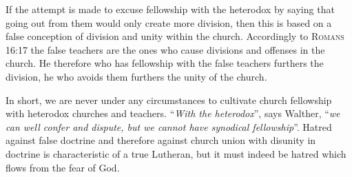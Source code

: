                 If the attempt is made to excuse fellowship with the heterodox by saying that going out from them would only create more division, then this is based on a false conception of division and unity within the church.  Accordingly to {\scriptsize\textsc{Romans 16:17}} the false teachers are the ones who cause divisions and offenses in the church.  He therefore who has fellowship with the false teachers furthers the division, he who avoids them furthers the unity of the church.\par
                In short, we are never under any circumstances to cultivate church fellowship with heterodox churches and teachers.  “\textit{With the heterodox}”, says Walther, ``\textit{we can well confer and dispute, but we cannot have synodical fellowship}''. Hatred against false doctrine and therefore against church union with disunity in doctrine is characteristic of a true Lutheran, but it must indeed be hatred which flows from the fear of God.

